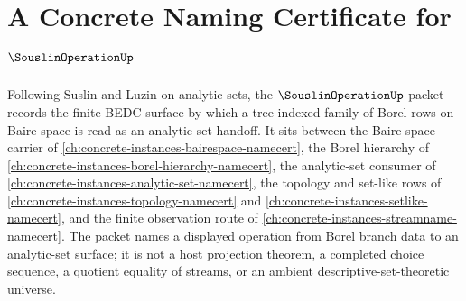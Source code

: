 \chapter{A Concrete Naming Certificate for $\SouslinOperationUp$}
\label{ch:concrete-instances-souslin-operation-namecert}

Following Suslin and Luzin on analytic sets, the $\SouslinOperationUp$ packet records the finite BEDC surface by which a tree-indexed family of Borel rows on Baire space is read as an analytic-set handoff. It sits between the Baire-space carrier of \autoref{ch:concrete-instances-bairespace-namecert}, the Borel hierarchy of \autoref{ch:concrete-instances-borel-hierarchy-namecert}, the analytic-set consumer of \autoref{ch:concrete-instances-analytic-set-namecert}, the topology and set-like rows of \autoref{ch:concrete-instances-topology-namecert} and \autoref{ch:concrete-instances-setlike-namecert}, and the finite observation route of \autoref{ch:concrete-instances-streamname-namecert}. The packet names a displayed operation from Borel branch data to an analytic-set surface; it is not a host projection theorem, a completed choice sequence, a quotient equality of streams, or an ambient descriptive-set-theoretic universe.

